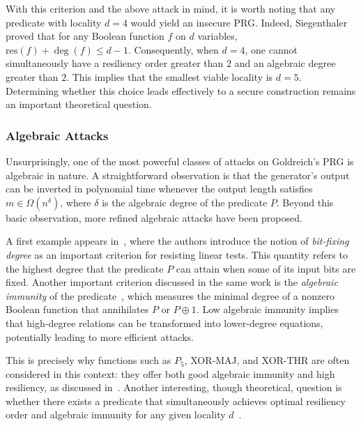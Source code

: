 With this criterion and the above attack in mind, it is worth noting that any predicate with locality $d = 4$ would yield an insecure PRG. Indeed, Siegenthaler~\cite{DBLP:journals/tit/Siegenthaler84} proved that for any Boolean function $f$ on $d$ variables, $\mathrm{res}(f) + \deg(f) \leq d - 1$. Consequently, when $d = 4$, one cannot simultaneously have a resiliency order greater than $2$ and an algebraic degree greater than $2$. 
This implies that the smallest viable locality is $d = 5$.  Determining whether this choice leads effectively to a secure construction remains an important theoretical question.


\subsubsection{Algebraic Attacks}

Unsurprisingly, one of the most powerful classes of attacks on Goldreich's PRG is algebraic in nature. A straightforward observation is that the generator's output can be inverted in polynomial time whenever the output length satisfies $m \in \Omega(n^{\delta})$, where  $\delta$ is the algebraic degree of the predicate $P$. Beyond this basic observation, more refined algebraic attacks have been proposed.

A first example appears in~\cite{STOC:AppLov16}, where the authors introduce the notion of \emph{bit-fixing degree} as an important criterion for resisting linear tests. This quantity refers to the highest degree that the predicate $P$ can attain when some of its input bits are fixed. Another important criterion discussed in the same work is the \emph{algebraic immunity} of the predicate~\cite{C:Courtois03,EC:CouMei03}, which measures the minimal degree of a nonzero Boolean function that annihilates $P$ or $P \oplus 1$. Low algebraic immunity implies that high-degree relations can be transformed into lower-degree equations, potentially leading to more efficient attacks.

This is precisely why functions such as \( P_5 \), \textsf{XOR-MAJ}, and \textsf{XOR-THR} are often considered in this context: they offer both good algebraic immunity and high resiliency, as discussed in~\cite{DBLP:journals/ccds/Meaux21, DBLP:journals/dam/Meaux22}. Another interesting, though theoretical, question is whether there exists a predicate that simultaneously achieves optimal resiliency order and algebraic immunity for any given locality $d$~\cite{DBLP:journals/dcc/DupinMR23}.


